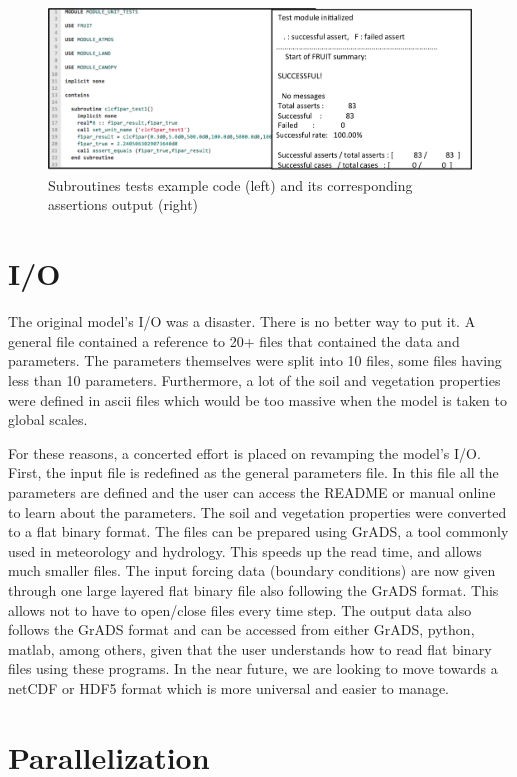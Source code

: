 \documentclass[pdftex,12pt,a4paper]{article}
\begin{document}
\begin{figure}[h]
	\centering
	\includegraphics[width=5.5in]{Figures/Tests2.png}
	\caption{Subroutines tests example code (left) and its corresponding assertions output (right)}
	\label{Tests1}
\end{figure}

\section{I/O}

The original model's I/O was a disaster. There is no better way to put it. A general file contained a reference to 20+ files that contained the data and parameters. The parameters themselves were split into 10 files, some files having less than 10 parameters. Furthermore, a lot of the soil and vegetation properties were defined in ascii files which would be too massive when the model is taken to global scales. 

For these reasons, a concerted effort is placed on revamping the model's I/O. First, the input file is redefined as the general parameters file. In this file all the parameters are defined and the user can access the README or manual online to learn about the parameters. The soil and vegetation properties were converted to a flat binary format. The files can be prepared using GrADS, a tool commonly used in meteorology and hydrology. This speeds up the read time, and allows much smaller files. The input forcing data (boundary conditions) are now given through one large layered flat binary file also following the GrADS format. This allows not to have to open/close files every time step. The output data also follows the GrADS format and can be accessed from either GrADS, python, matlab, among others, given that the user understands how to read flat binary files using these programs. In the near future, we are looking to move towards a netCDF or HDF5 format which is more universal and easier to manage.

\section{Parallelization}
\end{document}

